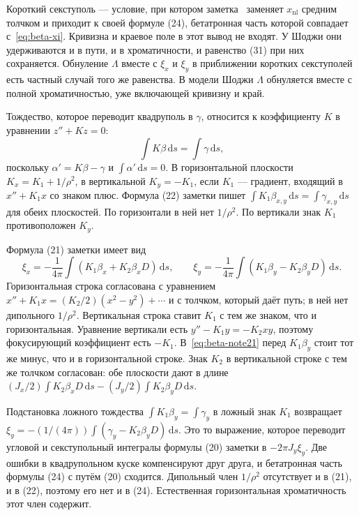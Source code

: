 \documentclass[aps,pra,preprint,a4paper,amsmath,amssymb,longbibliography]{revtex4-2}
\begin{document}
Короткий секступоль --- условие, при котором заметка~\cite{SenichevNote} заменяет $x_{\mathrm{nl}}$ средним толчком и приходит к своей формуле (24), бетатронная часть которой совпадает с~\eqref{eq:beta-xi}. Кривизна и краевое поле в этот вывод не входят. У Шоджи они удерживаются и в пути, и в хроматичности, и равенство (31) при них сохраняется. Обнуление $\Lambda$ вместе с $\xi_x$ и $\xi_y$ в приближении коротких секступолей есть частный случай того же равенства. В модели Шоджи $\Lambda$ обнуляется вместе с полной хроматичностью, уже включающей кривизну и край.

Тождество, которое переводит квадруполь в $\gamma$, относится к коэффициенту $K$ в уравнении $z''+Kz=0$:
\begin{equation}
\label{eq:beta-twiss}
\int K\beta\,\mathrm{d}s=\int\gamma\,\mathrm{d}s,
\end{equation}
поскольку $\alpha'=K\beta-\gamma$ и $\int\alpha'\,\mathrm{d}s=0$. В горизонтальной плоскости $K_x=K_1+1/\rho^2$, в вертикальной $K_y=-K_1$, если $K_1$ --- градиент, входящий в $x''+K_1 x$ со знаком плюс. Формула (22) заметки пишет $\int K_1\beta_{x,y}\,\mathrm{d}s=\int\gamma_{x,y}\,\mathrm{d}s$ для обеих плоскостей. По горизонтали в ней нет $1/\rho^2$. По вертикали знак $K_1$ противоположен $K_y$.

Формула (21) заметки имеет вид
\begin{equation}
\label{eq:beta-note21}
\xi_x=-\frac{1}{4\pi}\int(K_1\beta_x+K_2\beta_x D)\,\mathrm{d}s,
\qquad
\xi_y=-\frac{1}{4\pi}\int(K_1\beta_y-K_2\beta_y D)\,\mathrm{d}s.
\end{equation}
Горизонтальная строка согласована с уравнением $x''+K_1 x=(K_2/2)(x^2-y^2)+\cdots$ и с толчком, который даёт путь; в ней нет дипольного $1/\rho^2$. Вертикальная строка ставит $K_1$ с тем же знаком, что и горизонтальная. Уравнение вертикали есть $y''-K_1 y=-K_2 xy$, поэтому фокусирующий коэффициент есть $-K_1$. В~\eqref{eq:beta-note21} перед $K_1\beta_y$ стоит тот же минус, что и в горизонтальной строке. Знак $K_2$ в вертикальной строке с тем же толчком согласован: обе плоскости дают в длине $(J_x/2)\int K_2\beta_x D\,\mathrm{d}s-(J_y/2)\int K_2\beta_y D\,\mathrm{d}s$.

Подстановка ложного тождества $\int K_1\beta_y=\int\gamma_y$ в ложный знак $K_1$ возвращает $\xi_y=-(1/(4\pi))\int(\gamma_y-K_2\beta_y D)\,\mathrm{d}s$. Это то выражение, которое переводит угловой и секступольный интегралы формулы (20) заметки в $-2\pi J_y\xi_y$. Две ошибки в квадрупольном куске компенсируют друг друга, и бетатронная часть формулы (24) с путём (20) сходится. Дипольный член $1/\rho^2$ отсутствует и в (21), и в (22), поэтому его нет и в (24). Естественная горизонтальная хроматичность этот член содержит.
\end{document}
